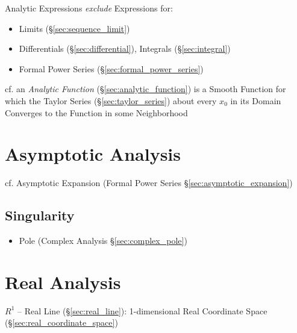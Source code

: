 Analytic Expressions \emph{exclude} Expressions for:
\begin{itemize}
  \item Limits (\S\ref{sec:sequence_limit})
  \item Differentials (\S\ref{sec:differential}), Integrals
    (\S\ref{sec:integral})
  \item Formal Power Series (\S\ref{sec:formal_power_series})
\end{itemize}

\fist cf. an \emph{Analytic Function} (\S\ref{sec:analytic_function}) is a
Smooth Function for which the Taylor Series (\S\ref{sec:taylor_series}) about
every $x_0$ in its Domain Converges to the Function in some Neighborhood



\section{Asymptotic Analysis}\label{sec:asymptotic_analysis}


\fist cf. Asymptotic Expansion (Formal Power Series
\S\ref{sec:asymptotic_expansion})



\subsection{Singularity}\label{sec:singularity}

\begin{itemize}
  \item Pole (Complex Analysis \S\ref{sec:complex_pole})
\end{itemize}



\section{Real Analysis}\label{sec:real_analysis}

$R^1$ -- Real Line (\S\ref{sec:real_line}): 1-dimensional Real
Coordinate Space (\S\ref{sec:real_coordinate_space})



